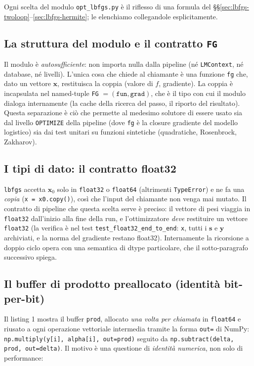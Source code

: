 Ogni scelta del modulo \texttt{opt\_lbfgs.py} è il riflesso di una formula
del \S\S\ref{sec:lbfgs-twoloop}--\ref{sec:lbfgs-hermite}; le elenchiamo
collegandole esplicitamente.

\subsection{La struttura del modulo e il contratto \texttt{FG}}

Il modulo è \emph{autosufficiente}: non importa nulla dalla pipeline
(né \texttt{LMContext}, né database, né livelli). L'unica cosa che
chiede al chiamante è una funzione \texttt{fg} che, dato un vettore
$\bm{x}$, restituisca la coppia (valore di $f$, gradiente). La coppia è
incapsulata nel named-tuple \texttt{FG} $= (\texttt{fun},\texttt{grad})$,
che è il tipo con cui il modulo dialoga internamente (la cache della
ricerca del passo, il riporto del risultato). Questa separazione è ciò
che permette al medesimo solutore di essere usato sia dal livello
\texttt{OPTIMIZE} della pipeline (dove \texttt{fg} è la closure
gradiente del modello logistico) sia dai test unitari su funzioni
sintetiche (quadratiche, Rosenbrock, Zakharov).

\subsection{I tipi di dato: il contratto float32}

\texttt{lbfgs} accetta $\bm{x}_0$ solo in \texttt{float32} o
\texttt{float64} (altrimenti \texttt{TypeError}) e ne fa una
\emph{copia} (\texttt{x = x0.copy()}), così che l'input del chiamante non
venga mai mutato. Il contratto di pipeline che questa scelta serve è
preciso: il vettore di pesi viaggia in \texttt{float32} dall'inizio alla
fine della run, e l'ottimizzatore \emph{deve} restituire un vettore
\texttt{float32} (la verifica è nel test
\texttt{test\_float32\_end\_to\_end}: \texttt{x}, tutti i $\bm{s}$ e
$\bm{y}$ archiviati, e la norma del gradiente restano float32).
Internamente la ricorsione a doppio ciclo opera con una semantica di dtype
particolare, che il sotto-paragrafo successivo spiega.

\subsection{Il buffer di prodotto preallocato (identità bit-per-bit)}

Il listing 1 mostra il buffer \texttt{prod}, allocato \emph{una volta per
chiamata} in \texttt{float64} e riusato a ogni operazione vettoriale
intermedia tramite la forma \texttt{out=} di NumPy:
\texttt{np.multiply(y[i], alpha[i], out=prod)} seguito da
\texttt{np.subtract(delta, prod, out=delta)}. Il motivo è una questione
di \emph{identità numerica}, non solo di performance:

